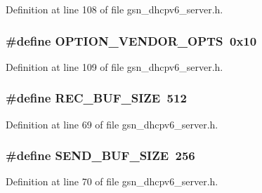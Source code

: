 Definition at line 108 of file gsn\_\-dhcpv6\_\-server.h.

\hypertarget{a00483_a9c051d005e37e3e849110ec191ccfe86}{
\subsubsection[{OPTION\_\-VENDOR\_\-OPTS}]{\setlength{\rightskip}{0pt plus 5cm}\#define OPTION\_\-VENDOR\_\-OPTS~0x10}}
\label{a00483_a9c051d005e37e3e849110ec191ccfe86}


Definition at line 109 of file gsn\_\-dhcpv6\_\-server.h.

\hypertarget{a00483_ab05acc32c9a175a532474a854e89595d}{
\subsubsection[{REC\_\-BUF\_\-SIZE}]{\setlength{\rightskip}{0pt plus 5cm}\#define REC\_\-BUF\_\-SIZE~512}}
\label{a00483_ab05acc32c9a175a532474a854e89595d}


Definition at line 69 of file gsn\_\-dhcpv6\_\-server.h.

\hypertarget{a00483_a4c6ddff94506616bb52409dfd2af1d0c}{
\subsubsection[{SEND\_\-BUF\_\-SIZE}]{\setlength{\rightskip}{0pt plus 5cm}\#define SEND\_\-BUF\_\-SIZE~256}}
\label{a00483_a4c6ddff94506616bb52409dfd2af1d0c}


Definition at line 70 of file gsn\_\-dhcpv6\_\-server.h.



